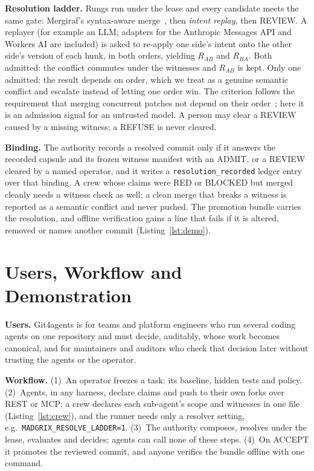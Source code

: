 \documentclass[10pt,conference]{IEEEtran}
\newcommand{\tool}{Git4agents}
\begin{document}
\textbf{Resolution ladder.} Rungs run under the lease and every candidate meets the same gate: Mergiraf's syntax-aware merge~\cite{mergiraf}, then \emph{intent replay}, then REVIEW. A replayer (for example an LLM; adapters for the Anthropic Messages API and Workers AI are included) is asked to re-apply one side's intent onto the other side's version of each hunk, in both orders, yielding $R_{AB}$ and $R_{BA}$. Both admitted: the conflict commutes under the witnesses and $R_{AB}$ is kept. Only one admitted: the result depends on order, which we treat as a genuine semantic conflict and escalate instead of letting one order win. The criterion follows the requirement that merging concurrent patches not depend on their order~\cite{mimram2013patches}; here it is an admission signal for an untrusted model. A person may clear a REVIEW caused by a missing witness; a REFUSE is never cleared.

\textbf{Binding.} The authority records a resolved commit only if it answers the recorded capsule and its frozen witness manifest with an ADMIT, or a REVIEW cleared by a named operator, and it writes a \texttt{resolution\_recorded} ledger entry over that binding. A crew whose claims were RED or BLOCKED but merged cleanly needs a witness check as well; a clean merge that breaks a witness is reported as a semantic conflict and never pushed. The promotion bundle carries the resolution, and offline verification gains a line that fails if it is altered, removed or names another commit (Listing~\ref{lst:demo}).

\section{Users, Workflow and Demonstration}\label{sec:demo}
\textbf{Users.} \tool{} is for teams and platform engineers who run several coding agents on one repository and must decide, auditably, whose work becomes canonical, and for maintainers and auditors who check that decision later without trusting the agents or the operator.

\textbf{Workflow.} (1)~An operator freezes a task: its baseline, hidden tests and policy. (2)~Agents, in any harness, declare claims and push to their own forks over REST or MCP; a crew declares each sub-agent's scope and witnesses in one file (Listing~\ref{lst:crew}), and the runner needs only a resolver setting, e.g.\ \texttt{MADGRIX\_RESOLVE\_LADDER=1}. (3)~The authority composes, resolves under the lease, evaluates and decides; agents can call none of these steps. (4)~On ACCEPT it promotes the reviewed commit, and anyone verifies the bundle offline with one command.
\end{document}
